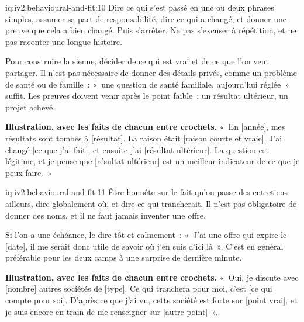 \begin{solution}{iq:iv2:behavioural-and-fit:10}
Dire ce qui s'est passé en une ou deux phrases simples, assumer sa part de responsabilité, dire ce qui a changé, et donner une preuve que cela a bien changé. Puis s'arrêter. Ne pas s'excuser à répétition, et ne pas raconter une longue histoire.

Pour construire la sienne, décider de ce qui est vrai et de ce que l'on veut partager. Il n'est pas nécessaire de donner des détails privés, comme un problème de santé ou de famille~: «~une question de santé familiale, aujourd'hui réglée~» suffit. Les preuves doivent venir après le point faible~: un résultat ultérieur, un projet achevé.

\textbf{Illustration, avec les faits de chacun entre crochets.} «~En [année], mes résultats sont tombés à [résultat]. La raison était [raison courte et vraie]. J'ai changé [ce que j'ai fait], et ensuite j'ai [résultat ultérieur]. La question est légitime, et je pense que [résultat ultérieur] est un meilleur indicateur de ce que je peux faire.~»

\end{solution}

\begin{solution}{iq:iv2:behavioural-and-fit:11}
Être honnête sur le fait qu'on passe des entretiens ailleurs, dire globalement où, et dire ce qui trancherait. Il n'est pas obligatoire de donner des noms, et il ne faut jamais inventer une offre.

Si l'on a une échéance, le dire tôt et calmement~: «~J'ai une offre qui expire le [date], il me serait donc utile de savoir où j'en suis d'ici là~». C'est en général préférable pour les deux camps à une surprise de dernière minute.

\textbf{Illustration, avec les faits de chacun entre crochets.} «~Oui, je discute avec [nombre] autres sociétés de [type]. Ce qui tranchera pour moi, c'est [ce qui compte pour soi]. D'après ce que j'ai vu, cette société est forte sur [point vrai], et je suis encore en train de me renseigner sur [autre point]~».

\end{solution}

